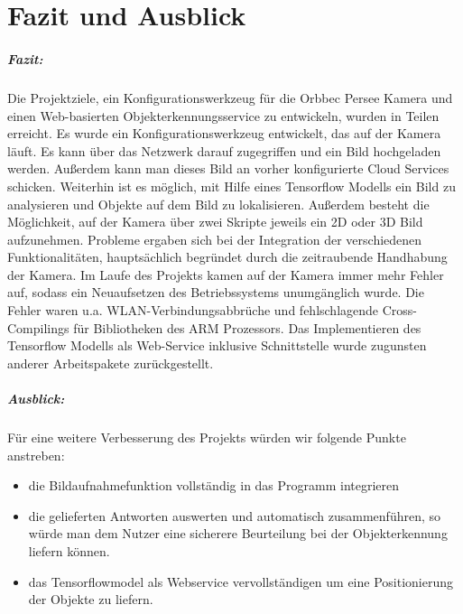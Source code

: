 \chapter{Fazit und Ausblick\label{cha:chapter6}}
\paragraph{Fazit:}
Die Projektziele, ein Konfigurationswerkzeug für die Orbbec Persee Kamera und einen Web-basierten Objekterkennungsservice zu entwickeln, wurden in Teilen erreicht.\newline
Es wurde ein Konfigurationswerkzeug entwickelt, das auf der Kamera läuft. Es kann über das Netzwerk darauf zugegriffen und ein Bild hochgeladen werden. Außerdem kann man dieses Bild an vorher konfigurierte Cloud Services schicken.\newline
Weiterhin ist es möglich, mit Hilfe eines Tensorflow Modells ein Bild zu analysieren und Objekte auf dem Bild zu lokalisieren.\newline
Außerdem besteht die Möglichkeit, auf der Kamera über zwei Skripte jeweils ein 2D oder 3D Bild aufzunehmen.\newline
Probleme ergaben sich bei der Integration der verschiedenen Funktionalitäten, hauptsächlich begründet durch die zeitraubende Handhabung der Kamera. Im Laufe des Projekts kamen auf der Kamera immer mehr Fehler auf, sodass ein Neuaufsetzen des Betriebssystems unumgänglich wurde. Die Fehler waren u.a. WLAN-Verbindungsabbrüche und fehlschlagende Cross-Compilings für Bibliotheken des ARM Prozessors.\newline
Das Implementieren des Tensorflow Modells als Web-Service inklusive Schnittstelle wurde zugunsten anderer Arbeitspakete zurückgestellt. 

\paragraph{Ausblick:}
Für eine weitere Verbesserung des Projekts würden wir folgende Punkte anstreben: 
\begin{itemize}
    \item die Bildaufnahmefunktion vollständig in das Programm integrieren 
    \item die gelieferten Antworten auswerten und automatisch zusammenführen, so würde man dem Nutzer eine sicherere Beurteilung bei der Objekterkennung liefern können.
    \item das Tensorflowmodel als Webservice vervollständigen um eine Positionierung der Objekte zu liefern.
\end{itemize}



